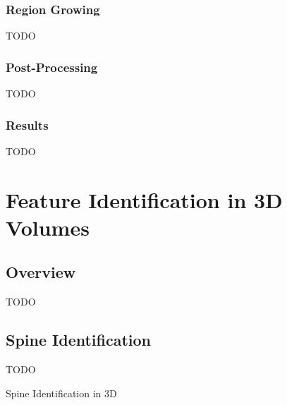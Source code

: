 \subsubsection{Region Growing}

TODO

\subsubsection{Post-Processing}

TODO

\subsubsection{Results}

TODO

\afterpage{\clearpage}
\newpage

\section{Feature Identification in 3D Volumes}

\subsection{Overview}

TODO

\subsection{Spine Identification}

TODO

\begin{stulisting}[p]
\caption{Spine Identification in 3D}
\label{code:featureid-3d-spineidentification}

\end{stulisting}

